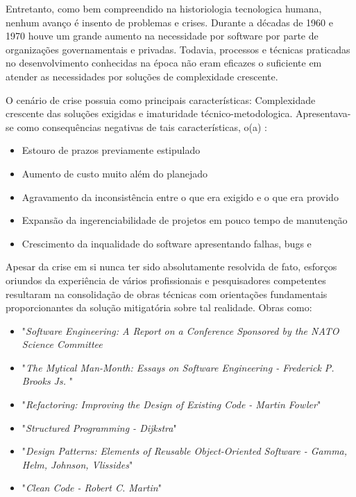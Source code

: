    Entretanto, como bem compreendido na historiologia tecnologica humana, nenhum
    avanço é insento de problemas e crises. Durante a décadas de 1960 e 1970 houve um grande aumento
    na necessidade por software por parte de organizações governamentais e privadas. Todavia,
    processos e técnicas praticadas no desenvolvimento conhecidas na época não eram eficazes
    o suficiente em atender as necessidades por soluções de complexidade crescente.
 
    O cenário de crise possuia como principais características: Complexidade crescente das
    soluções exigidas e imaturidade técnico-metodologica. Apresentava-se
    como consequências negativas de tais características, o(a) :

    \begin{itemize}
      \item{ Estouro de prazos previamente estipulado }
      \item{ Aumento de custo muito além do planejado }
      \item{ Agravamento da inconsistência entre o que era exigido e o que era provido }
      \item{ Expansão da ingerenciabilidade de projetos em pouco tempo de manutenção }
      \item{ Crescimento da inqualidade do software apresentando falhas, bugs e  }
    \end{itemize}

    Apesar da crise em si nunca ter sido absolutamente resolvida de fato, esforços oriundos da experiência
    de vários profissionais e pesquisadores competentes resultaram na consolidação de obras técnicas com orientações
    fundamentais proporcionantes da solução mitigatória sobre tal realidade. Obras como: 

    \begin{itemize}
      \item{ "\textit{Software Engineering: A Report on a Conference Sponsored by the NATO Science Committee} }
      \item{ "\textit{The Mytical Man-Month: Essays on Software Engineering - Frederick P. Brooks Js. }" }
      \item{ "\textit{Refactoring: Improving the Design of Existing Code - Martin Fowler}" }
      \item{ "\textit{Structured Programming - Dijkstra}" }
      \item{ "\textit{Design Patterns: Elements of Reusable Object-Oriented Software - Gamma, Helm, Johnson, Vlissides}" }
      \item{ "\textit{Clean Code - Robert C. Martin}" }
    \end{itemize}

